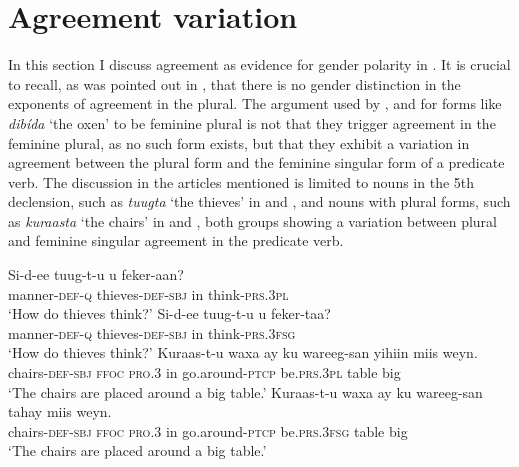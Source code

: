 \documentclass[output=paper]{langsci/langscibook}
\begin{document}
\section{Agreement variation}\label{sec:nilsson:3}
\largerpage
In this section I discuss agreement as evidence for gender polarity in . It is crucial to recall, as was pointed out in , that there is no gender distinction in the exponents of agreement in the plural. The argument used by \citet{Hetzron1972}, \citet{ZwickyPullum1983} and \citet{Lecarme2002} for forms like \textit{dibída} ‘the oxen’ to be feminine plural is not that they trigger agreement in the feminine plural, as no such form exists, but that they exhibit a variation in agreement between the plural form and the feminine singular form of a predicate verb. The discussion in the articles mentioned is limited to nouns in the 5th declension, such as \textit{tuugta} ‘the thieves’ in  and , and nouns with  plural forms, such as \textit{kuraasta} ‘the chairs’ in  and , both groups showing a variation between plural and feminine singular agreement in the predicate verb.

\ea\label{ex:nilsson:2}
\ea\label{ex:nilsson:2a}
\gll Si-d-ee             tuug-t-u             u  feker-aan?\\
       manner-\textsc{def-q} thieves-\textsc{def-sbj} in think-\textsc{prs.3pl}\\
\glt ‘How do thieves think?’
\ex\label{ex:nilsson:2b}
\gll  Si-d-ee             tuug-t-u             u  feker-taa?\\
       manner-\textsc{def-q} thieves-\textsc{def-sbj} in think-\textsc{prs.3fsg}\\
\glt ‘How do thieves think?’
\ex\label{ex:nilsson:2c}
\gll  Kuraas-t-u      waxa  ay     ku wareeg-san       yihiin         miis weyn.\\
       chairs-\textsc{def-sbj} \textsc{ffoc} \textsc{pro.3} in go.around\textsc{-ptcp} be\textsc{.prs.3pl} table big\\
\glt ‘The chairs are placed around a big table.’ 
\ex\label{ex:nilsson:2d}
\gll  Kuraas-t-u      waxa  ay     ku wareeg-san       tahay           miis weyn.\\
       chairs-\textsc{def-sbj} \textsc{ffoc} \textsc{pro.3} in go.around\textsc{-ptcp} be\textsc{.prs.3fsg} table big\\
\glt ‘The chairs are placed around a big table.’ 
\z
\z
\end{document}
